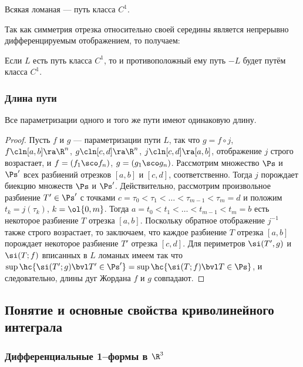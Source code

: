 \documentclass[a4paper]{article}
\begin{document}
\begin{imp}
Всякая ломаная --- путь класса $C^1$.

Так как симметрия отрезка относительно своей середины является
непрерывно дифференцируемым отображением, то получаем:
\end{imp}

\begin{imp}
Если $L$ есть путь класса $C^1$, то и противоположный ему путь $-L$
будет путём класса $C^1$.
\end{imp}

\subsubsection{Длина пути}

\begin{theorem}
\label{thm164} Все параметризации одного и того же пути имеют
одинаковую длину.
\end{theorem}

\begin{proof}
Пусть $f$ и $g$ --- параметризации пути $L$, так что $g=f\circ j$,
$f\cln [a,b]\ra\R^n$, $g\cln[c,d]\ra\R^n$, $j\cln[c,d]\ra[a,b]$,
отображение $j$ строго возрастает, и $f=(f_1\sco f_n)$, $g=(g_1\sco
g_n)$. Рассмотрим множество $\Ps$ и $\Ps'$ всех разбиений отрезков
$[a,b]$ и $[c,d]$, соответственно. Тогда $j$ порождает биекцию
множеств $\Ps$ и $\Ps'$. Действительно, рассмотрим произвольное
разбиение $T'\in\Ps'$ с точками $c=\tau_0 < \tau_1 < \ldots <
\tau_{m-1} < \tau_m=d$ и положим $t_k = j(\tau_k)$, $k=\ol{0,m}$.
Тогда $a=t_0<t_1<\ldots < t_{m-1}<t_m=b$ есть некоторое разбиение
$T$ отрезка $[a,b]$. Поскольку обратное отображение $j^{-1}$ также
строго возрастает, то заключаем, что каждое разбиение $T$ отрезка
$[a,b]$ порождает некоторое разбиение $T'$ отрезка $[c,d]$. Для
периметров $\si(T',g)$ и $\si(T;f)$ вписанных в $L$ ломаных имеем
так что $\sup\hc{\si(T';g) \bvl T'\in\Ps'} = \sup\hc{\si(T;f) \bvl
T\in\Ps}$, и следовательно, длины дуг Жордана $f$ и $g$ совпадают.
\end{proof}

\subsection{Понятие и основные свойства криволинейного интеграла}
\subsubsection{Дифференциальные 1--формы в $\R^3$}
\end{document}
